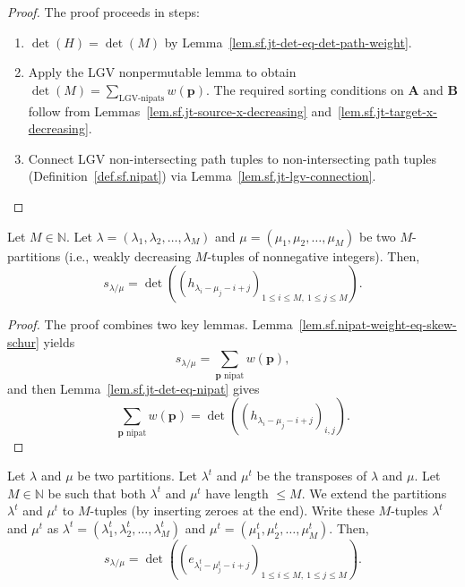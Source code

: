 \begin{proof}
\leanok
The proof proceeds in steps:
\begin{enumerate}
\item $\det(H) = \det(M)$ by
Lemma~\ref{lem.sf.jt-det-eq-det-path-weight}.
\item Apply the LGV nonpermutable lemma to obtain
$\det(M) = \sum_{\text{LGV-nipats}} w(\mathbf{p})$.
The required sorting conditions on $\mathbf{A}$ and $\mathbf{B}$
follow from Lemmas~\ref{lem.sf.jt-source-x-decreasing}
and~\ref{lem.sf.jt-target-x-decreasing}.
\item Connect LGV non-intersecting path tuples to non-intersecting path tuples
(Definition~\ref{def.sf.nipat}) via
Lemma~\ref{lem.sf.jt-lgv-connection}.
\end{enumerate}
\end{proof}

\begin{theorem}
\label{thm.sf.jt-h}
\leantarget
\leanok
Let $M\in\mathbb{N}$. Let
$\lambda=\left(  \lambda_{1},\lambda_{2},\ldots,\lambda_{M}\right)  $ and
$\mu=\left(  \mu_{1},\mu_{2},\ldots,\mu_{M}\right)  $ be two $M$-partitions
(i.e., weakly decreasing $M$-tuples of nonnegative integers). Then,%
\[
s_{\lambda/\mu}=\det\left(  \left(  h_{\lambda_{i}-\mu_{j}-i+j}\right)
_{1\leq i\leq M,\ 1\leq j\leq M}\right)  .
\]
\end{theorem}

\begin{proof}
The proof combines two key lemmas.
Lemma~\ref{lem.sf.nipat-weight-eq-skew-schur} yields
\[
s_{\lambda/\mu}
= \sum_{\mathbf{p} \text{ nipat}} w(\mathbf{p}),
\]
and then Lemma~\ref{lem.sf.jt-det-eq-nipat} gives
\[
\sum_{\mathbf{p} \text{ nipat}} w(\mathbf{p})
= \det\left( \left( h_{\lambda_i - \mu_j - i + j} \right)_{i,j} \right).
\]
\end{proof}

\begin{theorem}
\label{thm.sf.jt-e}
\leantarget
Let $\lambda$ and $\mu$ be two partitions. Let $\lambda^{t}$ and $\mu^{t}$
be the transposes of $\lambda$
and $\mu$. Let $M\in\mathbb{N}$ be such that both $\lambda^{t}$ and $\mu^{t}$
have length $\leq M$. We extend the partitions $\lambda^{t}$ and $\mu^{t}$
to $M$-tuples (by inserting zeroes at the end). Write these $M$-tuples
$\lambda^{t}$ and $\mu^{t}$ as $\lambda^{t}=\left(  \lambda_{1}^{t}%
,\lambda_{2}^{t},\ldots,\lambda_{M}^{t}\right)  $ and $\mu^{t}=\left(  \mu_{1}%
^{t},\mu_{2}^{t},\ldots,\mu_{M}^{t}\right)  $. Then,%
\[
s_{\lambda/\mu}=\det\left(  \left(  e_{\lambda_{i}^{t}-\mu_{j}^{t}%
-i+j}\right)  _{1\leq i\leq M,\ 1\leq j\leq M}\right)  .
\]
\end{theorem}

